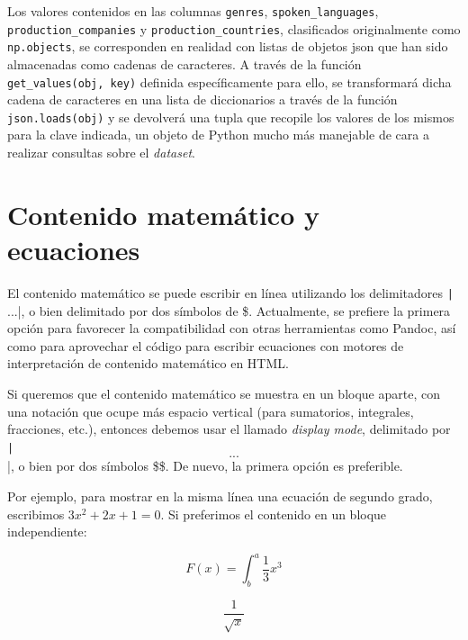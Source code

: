 \begin{itemize}
	
	\begin{sloppypar} %
		\item Los valores contenidos en las columnas \texttt{genres}, \texttt{spoken\_languages}, \texttt{production\_companies} y \texttt{production\_countries}, clasificados originalmente como \texttt{np.objects}, se corresponden en realidad con listas de objetos \gls{json} que han sido almacenadas como cadenas de caracteres. A través de la función \texttt{get\_values(obj, key)} definida específicamente para ello, se transformará dicha cadena de caracteres en una lista de diccionarios a través de la función \texttt{json.loads(obj)} y se devolverá una  tupla que recopile los valores de los mismos para la clave indicada, un objeto de Python mucho más manejable de cara a realizar consultas sobre el \textit{dataset}.
	\end{sloppypar}
	
\end{itemize}



\section{Contenido matemático y ecuaciones}
\label{sec:equations}

El contenido matemático se puede escribir en línea utilizando los delimitadores
\texttt|\(...\)|, o bien delimitado por dos símbolos de \$. Actualmente, se prefiere
la primera opción para favorecer la compatibilidad con otras herramientas como Pandoc, así como
para aprovechar el código para escribir ecuaciones con motores de interpretación de contenido
matemático en HTML.

Si queremos que el contenido matemático se muestra en un bloque aparte, con una notación que ocupe
más espacio vertical (para sumatorios, integrales, fracciones, etc.), entonces debemos usar el llamado
\textit{display mode}, delimitado por \texttt|\[...\]|, o bien por dos símbolos \$\$. 
De nuevo, la primera opción es preferible.

Por ejemplo, para mostrar en la misma línea una ecuación de segundo grado, escribimos \(3x^2 + 2x + 1 = 0\).
Si preferimos el contenido en un bloque independiente:

\[
F(x)=\int^a_b \frac{1}{3}x^3
\]

\[\frac{1}{\sqrt{x}}\]

